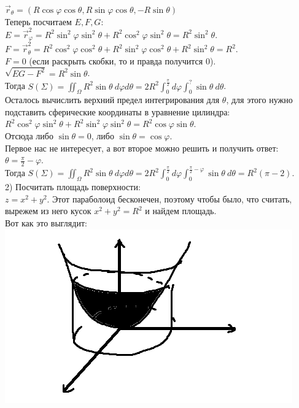 \documentclass[12pt]{article}
\begin{document}
$\overrightarrow{r}_\theta = (R\cos\varphi \cos\theta, R\sin\varphi \cos\theta, -R\sin\theta)$\\
Теперь посчитаем $E, F, G$:\\
$E = \overrightarrow{r}_\varphi^2 = R^2 \sin^2 \varphi \sin^2 \theta + R^2 \cos^2 \varphi \sin^2 \theta = R^2 \sin^2 \theta$.\\
$F = \overrightarrow{r}_\theta^2 = R^2 \cos^2 \varphi \cos^2 \theta + R^2 \sin^2 \varphi \cos^2 \theta + R^2 \sin^2 \theta = R^2$.\\
$F = 0$ (если раскрыть скобки, то и правда получится 0).\\
$\sqrt{EG-F^2} = R^2 \sin\theta$.\\
Тогда $S(\Sigma) = \iint_\Omega R^2 \sin\theta \ d\varphi d\theta = 2 R^2 \int_0^{\frac{\pi}{2}} d\varphi \int_0^? \sin\theta \ d\theta$.\\
Осталось вычислить верхний предел интегрирования для $\theta$, для этого нужно подставить сферические координаты в уравнение цилиндра:\\
$R^2 \cos^2 \varphi \sin^2 \theta + R^2 \sin^2 \varphi \sin^2\theta = R^2 \cos\varphi \sin\theta$.\\
Отсюда либо $\sin\theta = 0$, либо $\sin\theta = \cos\varphi$.\\
Первое нас не интересует, а вот второе можно решить и получить ответ:\\
$\theta = \frac{\pi}{2} - \varphi$.\\
Тогда $S(\Sigma) = \iint_\Omega R^2 \sin\theta \ d\varphi d\theta = 2 R^2 \int_0^{\frac{\pi}{2}} d\varphi \int_0^{\frac{\pi}{2} - \varphi} \sin\theta \ d\theta = R^2(\pi - 2)$.\\
2) Посчитать площадь поверхности:\\
$z = x^2 + y^2$. Этот параболоид бесконечен, поэтому чтобы было, что считать, вырежем из него кусок $x^2 + y^2 = R^2$ и найдем площадь.\\
Вот как это выглядит:\\
\includegraphics{paraboloidAndCylindr1}\\
\end{document}
